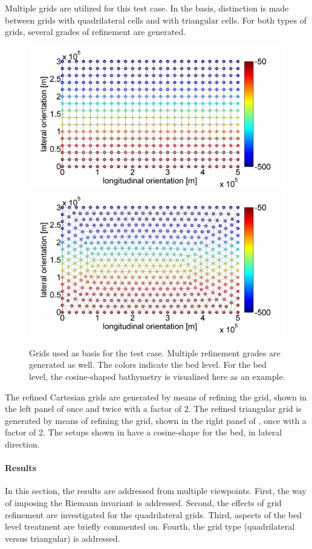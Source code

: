 Multiple grids are utilized for this test case. In the basis, distinction is made between grids with quadrilateral cells and with triangular cells. For both types of grids, several grades of refinement are generated.
\begin{figure}[h!]
\begin{center}
\includegraphics[width=0.48\columnwidth]{figures/coriolisstraightsquares.png}
\includegraphics[width=0.48\columnwidth]{figures/coriolisstraighttriangles.png}
\end{center}\caption{Grids used as basis for the test case. Multiple refinement grades are generated as well. The colors indicate the bed level. For the bed level, the cosine-shaped bathymetry is visualized here as an example. \label{fig:coriolisstraightgrids}}
\end{figure}
The refined Cartesian grids are generated by means of refining the grid, shown in the left panel of  once and twice with a factor of 2. The refined triangular grid is generated by means of refining the grid, shown in the right panel of , once with a factor of 2. The setups shown in  have a cosine-shape for the bed, in lateral direction.





\paragraph*{Results}
In this section, the results are addressed from multiple viewpoints. First, the way of imposing the Riemann invariant is addressed. Second, the effects of grid refinement are investigated for the quadrilateral grids. Third, aspects of the bed level treatment are briefly commented on. Fourth, the grid type (quadrilateral versus triangular) is addressed.

